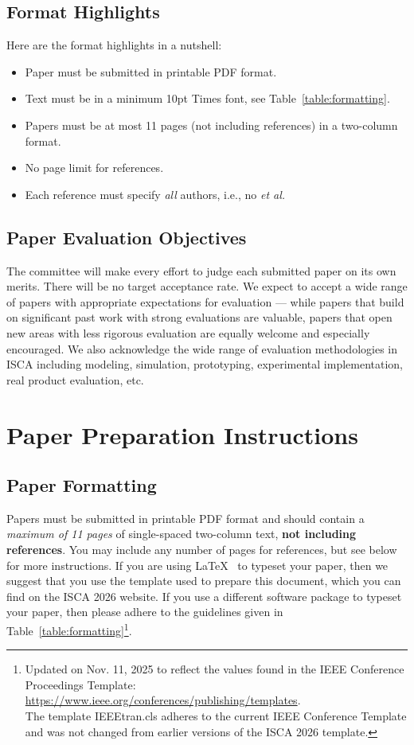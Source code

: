 \documentclass[conference]{IEEEtran}
\begin{document}
\subsection{Format Highlights}

Here are the format highlights in a nutshell:
\begin{itemize}
\item Paper must be submitted in printable PDF format.
\item Text must be in a minimum 10pt Times font, see Table~\ref{table:formatting}.
\item Papers must be at most 11 pages (not including references) in a
  two-column format.
\item No page limit for references.
\item Each reference must specify {\em all} authors, i.e., no {\em et al.}
\end{itemize}

\subsection{Paper Evaluation Objectives}
The committee will make every effort to judge each submitted paper on
its own merits. There will be no target acceptance rate. We expect to
accept a wide range of papers with appropriate expectations for
evaluation --- while papers that build on significant past work with
strong evaluations are valuable, papers that open new areas with less
rigorous evaluation are equally welcome and especially encouraged. We
also acknowledge the wide range of evaluation methodologies in ISCA including
modeling, simulation, prototyping, experimental implementation, real
product evaluation, etc.

\section{Paper Preparation Instructions}

\subsection{Paper Formatting}
Papers must be submitted in printable PDF format and should contain a
{\em maximum of 11 pages} of single-spaced two-column text, {\bf not
  including references}.  You may include any number of pages for
references, but see below for more instructions.  If you are using
\LaTeX~\cite{lamport94} to typeset your paper, then we suggest that
you use the template used to prepare this document, which you can find
on the ISCA 2026 website. If you use a different
software package to typeset your paper, then please adhere to the
guidelines given in Table~\ref{table:formatting}\footnote{Updated on Nov. 11, 2025 to reflect the values found in the IEEE Conference Proceedings Template: \\ \url{https://www.ieee.org/conferences/publishing/templates}. \\ The template IEEEtran.cls adheres to the current IEEE Conference Template and was not changed from earlier versions of the ISCA 2026 template.}.
\end{document}

